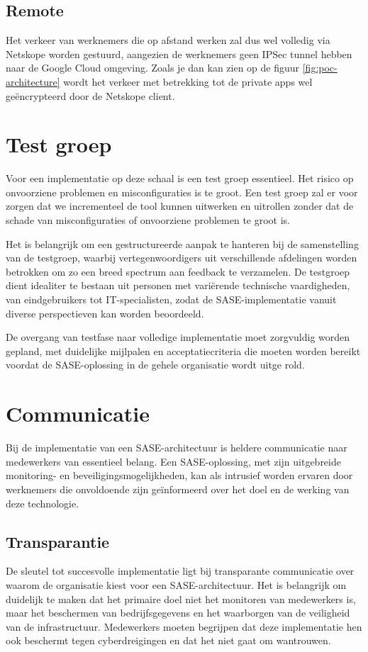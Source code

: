 \subsection{Remote}
Het verkeer van werknemers die op afstand werken zal dus wel volledig via Netskope worden gestuurd, aangezien de werknemers geen IPSec tunnel hebben naar de Google Cloud omgeving. Zoals je dan kan zien op de figuur \ref{fig:poc-architecture} wordt het verkeer met betrekking tot de private apps wel geëncrypteerd door de Netskope client.

\section{Test groep}
Voor een implementatie op deze schaal is een test groep essentieel. Het risico op onvoorziene problemen en misconfiguraties is te groot. Een test groep zal er voor zorgen dat we incrementeel de tool kunnen uitwerken en uitrollen zonder dat de schade van misconfiguraties of onvoorziene problemen te groot is.

Het is belangrijk om een gestructureerde aanpak te hanteren bij de samenstelling van de testgroep, waarbij vertegenwoordigers uit verschillende afdelingen worden betrokken om zo een breed spectrum aan feedback te verzamelen. De testgroep dient idealiter te bestaan uit personen met variërende technische vaardigheden, van eindgebruikers tot IT-specialisten, zodat de SASE-implementatie vanuit diverse perspectieven kan worden beoordeeld.

De overgang van testfase naar volledige implementatie moet zorgvuldig worden gepland, met duidelijke mijlpalen en acceptatiecriteria die moeten worden bereikt voordat de SASE-oplossing in de gehele organisatie wordt uitge rold.

\section{Communicatie}
Bij de implementatie van een SASE-architectuur is heldere communicatie naar medewerkers van essentieel belang. Een SASE-oplossing, met zijn uitgebreide monitoring- en beveiligingsmogelijkheden, kan als intrusief worden ervaren door werknemers die onvoldoende zijn geïnformeerd over het doel en de werking van deze technologie.

\subsection{Transparantie}
De sleutel tot succesvolle implementatie ligt bij transparante communicatie over waarom de organisatie kiest voor een SASE-architectuur. Het is belangrijk om duidelijk te maken dat het primaire doel niet het monitoren van medewerkers is, maar het beschermen van bedrijfsgegevens en het waarborgen van de veiligheid van de infrastructuur. Medewerkers moeten begrijpen dat deze implementatie hen ook beschermt tegen cyberdreigingen en dat het niet gaat om wantrouwen.


